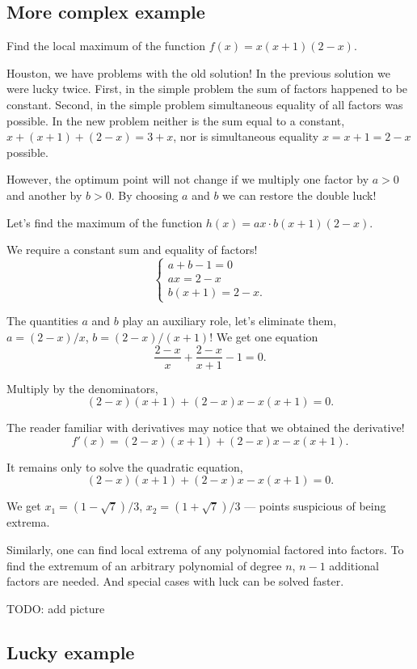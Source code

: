 \documentclass[12pt]{article}
\begin{document}
\subsection*{More complex example}


Find the local maximum of the function $f(x) = x (x + 1) (2 - x)$.


Houston, we have problems with the old solution!
In the previous solution we were lucky twice.
First, in the simple problem the sum of factors happened to be constant.
Second, in the simple problem simultaneous equality of all factors was possible. 
In the new problem neither is the sum equal to a constant, $x + (x + 1) + (2 - x) = 3 +x$, nor is simultaneous equality $x = x+1 = 2-x$ possible.

However, the optimum point will not change if we multiply one factor by $a > 0$ and another by $b > 0$.
By choosing $a$ and $b$ we can restore the double luck!

Let's find the maximum of the function $h(x) = ax \cdot b(x + 1) (2 - x)$.

We require a constant sum and equality of factors!
\[
\begin{cases}
    a + b - 1 = 0 \\
    ax = 2 - x \\
    b(x + 1) = 2 - x.
\end{cases}
\]

The quantities $a$ and $b$ play an auxiliary role, let's eliminate them, $a = (2 - x)/x$, $b = (2 - x)/(x + 1)$!
We get one equation 
\[
\frac{2 - x}{x} + \frac{2 - x}{x + 1} - 1 = 0.
\]

Multiply by the denominators,
\[
(2 - x)(x + 1) + (2 - x) x - x (x + 1) = 0.
\]

The reader familiar with derivatives may notice that we obtained the derivative!
\[
f'(x) = (2 - x)(x + 1) + (2 - x) x - x (x + 1).
\]

It remains only to solve the quadratic equation,
\[
(2 - x)(x + 1) + (2 - x) x - x (x + 1) = 0.
\]

We get $x_1 = (1 - \sqrt{7}) / 3$, $x_2 = (1 + \sqrt{7}) / 3$ — points suspicious of being extrema.


Similarly, one can find local extrema of any polynomial factored into factors. 
To find the extremum of an arbitrary polynomial of degree $n$, $n - 1$ additional factors are needed. 
And special cases with luck can be solved faster. 

TODO: add picture


\subsection*{Lucky example}
\end{document}
